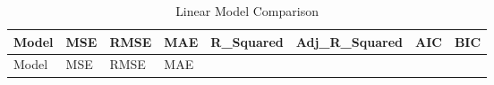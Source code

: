 \documentclass[
  11pt]{article}
\begin{document}
\begin{longtable}[]{@{}
  >{\raggedright\arraybackslash}p{}
  >{\raggedleft\arraybackslash}p{}
  >{\raggedleft\arraybackslash}p{}
  >{\raggedleft\arraybackslash}p{}
  >{\raggedleft\arraybackslash}p{}
  >{\raggedleft\arraybackslash}p{}
  >{\raggedleft\arraybackslash}p{}
  >{\raggedleft\arraybackslash}p{}@{}}
\caption{Linear Model Comparison}\tabularnewline
\toprule\noalign{}
\begin{minipage}[b]{\linewidth}\raggedright
Model
\end{minipage} & \begin{minipage}[b]{\linewidth}\raggedleft
MSE
\end{minipage} & \begin{minipage}[b]{\linewidth}\raggedleft
RMSE
\end{minipage} & \begin{minipage}[b]{\linewidth}\raggedleft
MAE
\end{minipage} & \begin{minipage}[b]{\linewidth}\raggedleft
R\_Squared
\end{minipage} & \begin{minipage}[b]{\linewidth}\raggedleft
Adj\_R\_Squared
\end{minipage} & \begin{minipage}[b]{\linewidth}\raggedleft
AIC
\end{minipage} & \begin{minipage}[b]{\linewidth}\raggedleft
BIC
\end{minipage} \\
\midrule\noalign{}
\endfirsthead
\toprule\noalign{}
\begin{minipage}[b]{\linewidth}\raggedright
Model
\end{minipage} & \begin{minipage}[b]{\linewidth}\raggedleft
MSE
\end{minipage} & \begin{minipage}[b]{\linewidth}\raggedleft
RMSE
\end{minipage} & \begin{minipage}[b]{\linewidth}\raggedleft
MAE
\end{minipage} & \begin{minipage}[b]{\linewidth}\raggedleft

\end{minipage}
\end{longtable}
\end{document}
